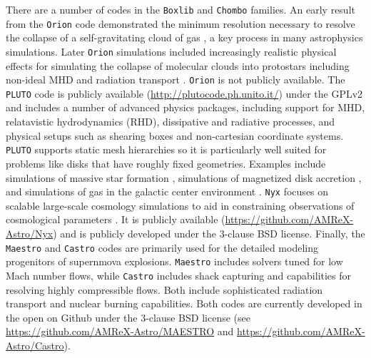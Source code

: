 \documentclass[11pt,twoside]{article}
\begin{document}
There are a number of codes in the \texttt{Boxlib} and \texttt{Chombo} families. An early result from the \texttt{Orion} code \citep{klein1999, li2012} demonstrated the minimum resolution necessary to resolve the collapse of a self-gravitating cloud of gas  \citep{truelove1998}, a key process in many astrophysics simulations. Later \texttt{Orion} simulations included increasingly realistic physical effects for simulating the collapse of molecular clouds into protostars including non-ideal MHD and radiation transport \citep{myers2014, rosen2016}. \texttt{Orion} is not publicly available. The \texttt{PLUTO} code \citep{mignone2012} is publicly available (\url{http://plutocode.ph.unito.it/}) under the GPLv2 and includes a number of advanced physics packages, including support for MHD, relatavistic hydrodynamics (RHD), dissipative and radiative processes, and physical setups such as shearing boxes and non-cartesian coordinate systems. \texttt{PLUTO} supports static mesh hierarchies so it is particularly well suited for problems like disks that have roughly fixed geometries. Examples include simulations of massive star formation \citep{kuiper2010}, simulations of magnetized disk accretion \citep{lesur2014}, and simulations of gas in the galactic center environment \citep{burkert2012}. \texttt{Nyx} \citep{almgren2013} focuses on scalable large-scale cosmology simulations to aid in constraining observations of cosmological parameters \citep{sorini2016}. It is publicly available (\url{https://github.com/AMReX-Astro/Nyx}) and is publicly developed under the 3-clause BSD license. Finally, the \texttt{Maestro} and \texttt{Castro} codes are primarily used for the detailed modeling progenitors of supernmova explosions. \texttt{Maestro} \citep{nonoka2014} includes solvers tuned for low Mach number flows, while \texttt{Castro} \citep{almgren2010} includes shack capturing and capabilities for resolving highly compressible flows. Both include sophisticated radiation transport and nuclear burning capabilities. Both codes are currently developed in the open on Github under the 3-clause BSD license (see \url{https://github.com/AMReX-Astro/MAESTRO} and \url{https://github.com/AMReX-Astro/Castro}).
\end{document}
